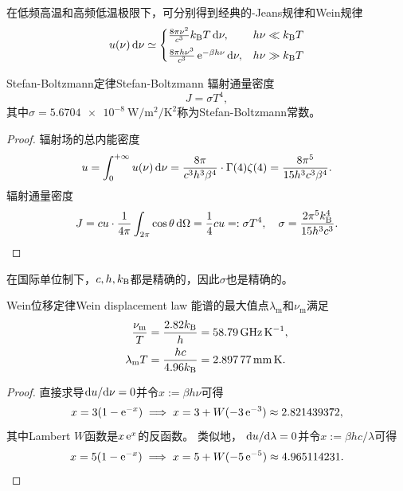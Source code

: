 \begin{corollary}
	在低频高温和高频低温极限下，可分别得到经典的\Rayl-Jeans规律和Wein规律
	\[
		u(\nu)\mathop{}\!\mathrm{d}\nu\simeq
		\begin{cases}
			\frac{8\pi\nu^2}{c^3}k_{\mathrm B} T\mathop{}\!\mathrm{d}\nu,&h\nu\ll k_{\mathrm B} T\\[1ex]
			\frac{8\pi h\nu^3}{c^3}\mathop{}\!\mathrm{e}^{-\beta h\nu}\mathop{}\!\mathrm{d}\nu,&h\nu\gg k_{\mathrm B} T
		\end{cases}
	\]
\end{corollary}

\begin{theorem}
	{Stefan-Boltzmann定律}{Stefan-Boltzmann}
	辐射通量密度
	\begin{equation}
		J=\sigma T^4,
	\end{equation}
	其中$\sigma=\SI{5.6704e-8}{\W\per\m\squared\per\K\squared}$称为Stefan-Boltzmann常数。
\end{theorem}

\begin{proof}
	辐射场的总内能密度
	\[
		u=\int_0^{+\infty} u(\nu)\mathop{}\!\mathrm{d}\nu=\frac{8\pi}{c^3h^3\beta^4}\cdot\Gamma(4)\zeta(4)=\frac{8\pi^5}{15h^3c^3\beta^4}.
	\]
	辐射通量密度
	\[
		J=cu\cdot\frac1{4\pi}\int_{2\pi}\cos\theta\mathop{}\!\mathrm{d}\Omega
		=\frac14cu=:\sigma T^4,
		\quad
		\sigma=\frac{2\pi^5k_{\mathrm B}^4}{15h^3c^3}.
		\qedhere
	\]
\end{proof}

\begin{remark}
	在国际单位制下，$c,h,k_{\mathrm B}$都是精确的，因此$\sigma$也是精确的。
\end{remark}

\begin{theorem}
	{Wein位移定律}{Wein displacement law}
	能谱的最大值点$\lambda_{\mathrm m}$和$\nu_{\mathrm m}$满足
	\begin{subequations}
		\begin{align}
			\frac{\nu_{\mathrm m}}T&=\frac{2.82\kB}{h}=\SI{58.79}{\GHz\per\K},\\
			\lambda_{\mathrm m}T&=\frac{hc}{4.96\kB}=\SI{2.89777}{\mm\K}.		
		\end{align}
	\end{subequations}
\end{theorem}

\begin{proof}
	直接求导$\mathop{}\!\mathrm{d} u/\mathrm{d}\nu=0$并令$x:=\beta h\nu$可得
	\[
		x=3(1-\mathop{}\!\mathrm{e}^{-x})\implies x=3+W(-3\mathop{}\!\mathrm{e}^{-3})\approx 2.821439372,
	\]
	其中Lambert $W$函数是$x\mathop{}\!\mathrm{e}^ x$的反函数。
	类似地，
	$\mathop{}\!\mathrm{d} u/\mathrm{d}\lambda=0$并令$x:=\beta hc/\lambda$可得
	\[
		x=5(1-\mathop{}\!\mathrm{e}^{-x})\implies x=5+W(-5\mathop{}\!\mathrm{e}^{-5})\approx 4.965114231.
		\qedhere
	\]
\end{proof}


